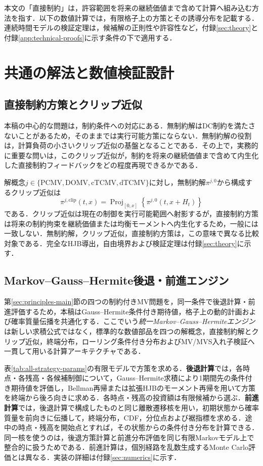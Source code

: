 \documentclass[10pt,a4paper]{article}
\theoremstyle{plain}
\theoremstyle{definition}
\DeclareMathOperator{\Proj}{Proj}
\begin{document}
本文の「直接制約」は，許容範囲を将来の継続価値まで含めて計算へ組み込む方法を指す．以下の数値計算では，有限格子上の方策とその誘導分布を記載する．連続時間モデルの検証定理は，候補解の正則性や許容性など，付録\ref{sec:theory}と付録\ref{app:technical-proofs}に示す条件の下で適用する．
\section{共通の解法と数値検証設計}\label{sec:method-main}
\subsection{直接制約方策とクリップ近似}\label{sec:method-constraints}
本稿の中心的な問題は，制約条件への対応にある．無制約解はDC制約を満たさないことがあるため，そのままでは実行可能方策にならない．無制約解の役割は，計算負荷の小さいクリップ近似の基盤となることである．その上で，実務的に重要な問いは，このクリップ近似が，制約を将来の継続価値まで含めて内生化した直接制約フィードバックをどの程度再現できるかである．

解概念$j\in\{\mathrm{PCMV},\mathrm{DOMV},\mathrm{cTCMV},\mathrm{dTCMV}\}$に対し，無制約解$\pi^{j,0}$から構成するクリップ近似は
\[
\pi^{j,\mathrm{clip}}(t,x)=\Proj_{[0,x]}\!\left\{\pi^{j,0}(t,x+H_t)\right\}
\]
である．クリップ近似は現在の制御を実行可能範囲へ射影するが，直接制約方策は将来の制約拘束を継続価値または均衡モーメントへ内生化するため，一般には一致しない．無制約解，クリップ近似，直接制約方策は，この意味で異なる比較対象である．完全なHJB導出，自由境界および検証定理は付録\ref{sec:theory}に示す．

\subsection{Markov--Gauss--Hermite後退・前進エンジン}\label{sec:method-engine}
第\ref{sec:principles-main}節の四つの制約付きMV問題を，同一条件で後退計算・前進評価するため，本稿はGauss--Hermite条件付き期待値，格子上の動的計画および確率質量伝播を共通化する．ここでいう\emph{統一Markov--Gauss--Hermiteエンジン}は新しい求積公式ではなく，標準的な数値部品を四つの解概念，直接制約解とクリップ近似，終端分布，ローリング条件付き分布およびMV/MVS入れ子検証へ一貫して用いる計算アーキテクチャである．

表\ref{tab:all-strategy-params}の有限モデルで方策を求める．\textbf{後退計算}では，各時点・各残高・各候補制御について，Gauss--Hermite求積により1期間先の条件付き期待値を評価し，Bellman再帰または拡張HJBのモーメント再帰を用いて方策を終端から後ろ向きに求める．各時点・残高の投資額は有限候補から選ぶ．\textbf{前進計算}では，後退計算で構成したものと同じ離散遷移核を用い，初期状態から確率質量を前向きに伝播して，終端分布，CDF，分位点および裾指標を求める．途中の時点・残高を開始点とすれば，その状態からの条件付き分布を計算できる．同一核を使うのは，後退方策計算と前進分布評価を同じ有限Markovモデル上で整合的に扱うためである．前進計算は，個別経路を乱数生成するMonte Carlo評価とは異なる．実装の詳細は付録\ref{sec:numerics}に示す．
\end{document}
